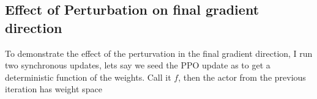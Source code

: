 \documentclass[11pt]{article}
\begin{document}


\subsection*{Effect of Perturbation on final gradient direction}
To demonstrate the effect of the perturvation in the final gradient direction, I run two synchronous updates, lets say we seed the PPO update as to get a deterministic function of the weights. Call it $f$, then the actor from the previous iteration has weight space 




\end{document}

